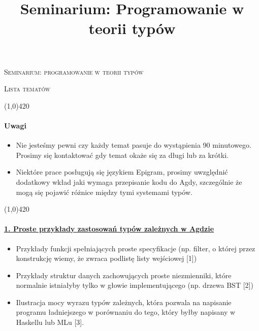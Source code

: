 \documentclass[10pt, a4paper]{article}
\author{}
\title{Seminarium: Programowanie w teorii typów}
\begin{document}
\begin{center}
\begin{LARGE}
\textsc{Seminarium: programowanie w teorii typów}
\end{LARGE}
\end{center}

\begin{center}
\begin{Large}
\textsc{Lista tematów}
\end{Large}
\end{center}

\begin{center}
\line(1,0){420}
\end{center}

\paragraph{Uwagi}

\begin{itemize}
\addtolength{\itemsep}{-0.3\baselineskip}
 \item Nie jesteśmy pewni czy każdy temat pasuje do wystąpienia 90 minutowego. Prosimy się kontaktować gdy temat
       okaże się za długi lub za krótki.
 \item Niektóre prace posługują się językiem Epigram, prosimy uwzględnić dodatkowy wkład jaki wymaga przepisanie
       kodu do Agdy, szczególnie że mogą się pojawić różnice między tymi systemami typów.
\end{itemize}
\begin{center}
\line(1,0){420}
\end{center}

\paragraph{\underline{1. Proste przykłady zastosowań typów zależnych w Agdzie}}

\begin{itemize}
\addtolength{\itemsep}{-0.5\baselineskip}
\item
    Przykłady funkcji spełniających proste specyfikacje (np. filter, o której przez konstrukcję wiemy, że zwraca podlistę listy wejściowej [1])
\item
    Przykłady struktur danych zachowujących proste niezmienniki, które normalnie istniałyby tylko w głowie implementującego (np. drzewa BST [2])
\item
    Ilustracja mocy wyrazu typów zależnych, która pozwala na napisanie programu ładniejszego w porównaniu do tego, który byłby napisany w Haskellu lub MLu [3].

\end{itemize}
\end{document}
